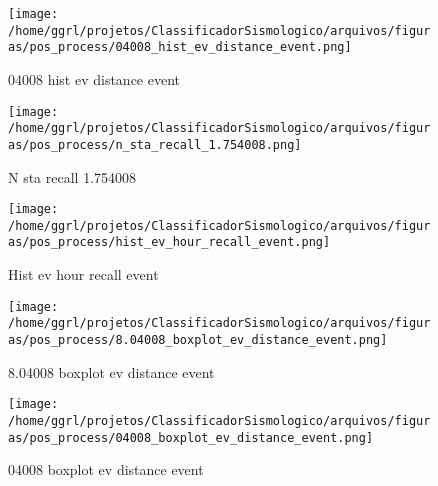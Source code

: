                     \begin{figure}[H]
                        \centering
                        \texttt{[image: /home/ggrl/projetos/ClassificadorSismologico/arquivos/figuras/pos\_process/04008\_hist\_ev\_distance\_event.png]}
                        \caption{04008 hist ev distance event}
                        \label{fig:04008_hist_ev_distance_event}
                    \end{figure}
                

                    \begin{figure}[H]
                        \centering
                        \texttt{[image: /home/ggrl/projetos/ClassificadorSismologico/arquivos/figuras/pos\_process/n\_sta\_recall\_1.754008.png]}
                        \caption{N sta recall 1.754008}
                        \label{fig:n_sta_recall_1.754008}
                    \end{figure}
                

                    \begin{figure}[H]
                        \centering
                        \texttt{[image: /home/ggrl/projetos/ClassificadorSismologico/arquivos/figuras/pos\_process/hist\_ev\_hour\_recall\_event.png]}
                        \caption{Hist ev hour recall event}
                        \label{fig:hist_ev_hour_recall_event}
                    \end{figure}
                

                    \begin{figure}[H]
                        \centering
                        \texttt{[image: /home/ggrl/projetos/ClassificadorSismologico/arquivos/figuras/pos\_process/8.04008\_boxplot\_ev\_distance\_event.png]}
                        \caption{8.04008 boxplot ev distance event}
                        \label{fig:8.04008_boxplot_ev_distance_event}
                    \end{figure}
                

                    \begin{figure}[H]
                        \centering
                        \texttt{[image: /home/ggrl/projetos/ClassificadorSismologico/arquivos/figuras/pos\_process/04008\_boxplot\_ev\_distance\_event.png]}
                        \caption{04008 boxplot ev distance event}
                        \label{fig:04008_boxplot_ev_distance_event}
                    \end{figure}
                

